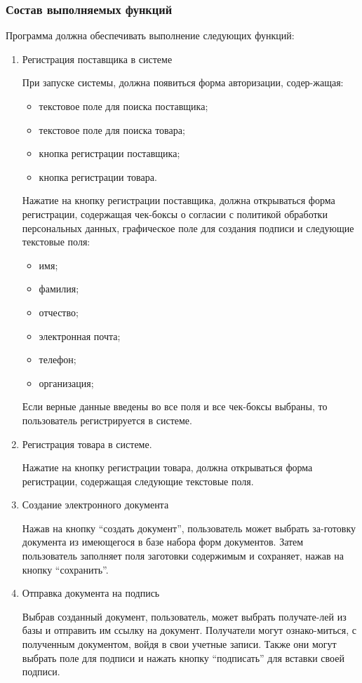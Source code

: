 \documentclass[14pt]{extarticle}        %
\begin{document}
\subsubsection{Состав выполняемых функций}
Программа должна обеспечивать выполнение следующих функций:\par
\begin{enumerate} 
    \item Регистрация поставщика в системе\par\parindent=1cm
    При запуске системы, должна появиться форма авторизации, содер-жащая:
    \begin{itemize}
        \item текстовое поле для поиска поставщика;
        \item текстовое поле для поиска товара;
        \item кнопка регистрации поставщика;
        \item кнопка регистрации товара.
    \end{itemize}\par\parindent=1cm
    Нажатие на кнопку регистрации поставщика, должна открываться форма регистрации, содержащая чек-боксы о согласии с политикой обработки персональных данных, графическое поле для создания подписи и следующие текстовые поля:
    \begin{itemize}
        \item имя;
        \item фамилия;
        \item отчество;
        \item электронная почта;
        \item телефон;
        \item организация;
    \end{itemize}\par\parindent=1cm
    Если верные данные введены во все поля и все чек-боксы выбраны, то пользователь регистрируется в системе.
    
    \item Регистрация товара в системе.\par\parindent=1cm
    Нажатие на кнопку регистрации товара, должна открываться форма регистрации, содержащая следующие текстовые поля.
    
    \item Создание электронного документа\par\parindent=1cm
    Нажав на кнопку “создать документ”, пользователь может выбрать за-готовку документа из имеющегося в базе набора форм документов. Затем пользователь заполняет поля заготовки содержимым и сохраняет, нажав на кнопку “сохранить”.
    
    \item Отправка документа на подпись\par\parindent=1cm
    Выбрав созданный документ, пользователь, может выбрать получате-лей из базы и отправить им ссылку на документ. Получатели могут ознако-миться, с полученным документом, войдя в свои учетные записи. Также они могут выбрать поле для подписи и нажать кнопку “подписать” для вставки своей подписи.
\end{enumerate}
\end{document}
